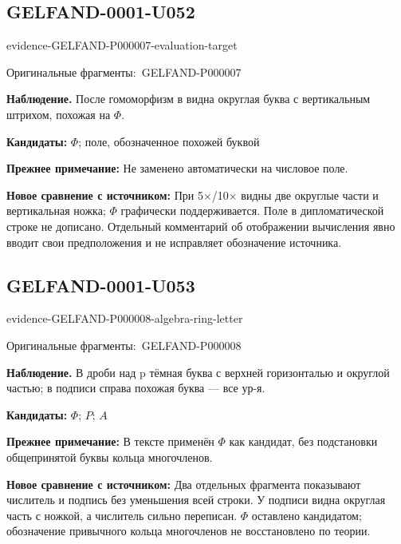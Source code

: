 \documentclass[11pt]{article}
\newcommand{\EvidenceBlock}[4]{%
 \par\smallskip\noindent\begin{minipage}{\linewidth}
 \begin{minipage}[t]{.47\linewidth}\vspace{0pt}\centering
 \csname evidence-#1-#2\endcsname\par
 {\scriptsize\SourceCropCaption\ #1}\par
 \end{minipage}\hfill
 \begin{minipage}[t]{.49\linewidth}\vspace{0pt}\raggedright
 {\small\color{orange!65!black}\textbf{#4} #3}\par
 \end{minipage}
 \end{minipage}\par\smallskip}
\newcommand{\SourceCropCaption}{Оригинальные фрагменты:}\newcommand{\ReadingCaption}{Сомнительное чтение.}\newcommand{\IncompleteCaption}{Неразобранный фрагмент.}\newcommand{\DiagramCaption}{Рисунок и набранное описание.}
\begin{document}
\subsection*{GELFAND-0001-U052}
\EvidenceBlock{GELFAND-P000007}{evaluation-target}{После гомоморфизм в видна округлая буква с вертикальным штрихом, похожая на \(\Phi\).}{Наблюдение.}
\par\smallskip\noindent\textbf{Кандидаты: } \(\Phi\); поле, обозначенное похожей буквой\par
\par\smallskip\noindent\textbf{Прежнее примечание: } Не заменено автоматически на числовое поле.\par
\par\smallskip\noindent\textbf{Новое сравнение с источником: } При 5×/10× видны две округлые части и вертикальная ножка; \(\Phi\) графически поддерживается. Поле в дипломатической строке не дописано. Отдельный комментарий об отображении вычисления явно вводит свои предположения и не исправляет обозначение источника.\par

\subsection*{GELFAND-0001-U053}
\EvidenceBlock{GELFAND-P000008}{algebra-ring-letter}{В дроби над p тёмная буква с верхней горизонталью и округлой частью; в подписи справа похожая буква — все ур-я.}{Наблюдение.}
\par\smallskip\noindent\textbf{Кандидаты: } \(\Phi\); \(P\); \(A\)\par
\par\smallskip\noindent\textbf{Прежнее примечание: } В тексте применён \(\Phi\) как кандидат, без подстановки общепринятой буквы кольца многочленов.\par
\par\smallskip\noindent\textbf{Новое сравнение с источником: } Два отдельных фрагмента показывают числитель и подпись без уменьшения всей строки. У подписи видна округлая часть с ножкой, а числитель сильно переписан. \(\Phi\) оставлено кандидатом; обозначение привычного кольца многочленов не восстановлено по теории.\par
\end{document}
